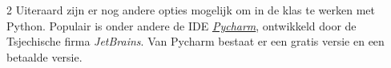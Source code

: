 \begin{multicols}{2}
Uiteraard zijn er nog andere opties mogelijk om in de klas te werken met Python. Populair is onder andere de IDE \href{https://www.jetbrains.com/pycharm/}{\emph{Pycharm}}, ontwikkeld door de Tsjechische firma \emph{JetBrains}. Van Pycharm bestaat er een gratis versie en een betaalde versie. 





	
		
	
\end{multicols}

\stopcontents[inhoudloep]		%
\vspace{-1cm}

